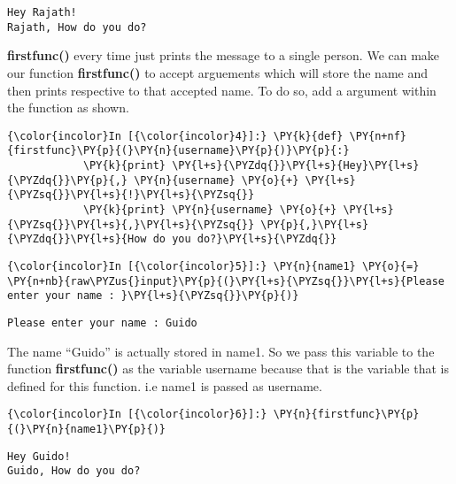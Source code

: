     \begin{Verbatim}[commandchars=\\\{\}]
Hey Rajath!
Rajath, How do you do?
    \end{Verbatim}

    \textbf{firstfunc()} every time just prints the message to a single
person. We can make our function \textbf{firstfunc()} to accept
arguements which will store the name and then prints respective to that
accepted name. To do so, add a argument within the function as shown.

    \begin{Verbatim}[commandchars=\\\{\}]
{\color{incolor}In [{\color{incolor}4}]:} \PY{k}{def} \PY{n+nf}{firstfunc}\PY{p}{(}\PY{n}{username}\PY{p}{)}\PY{p}{:}
            \PY{k}{print} \PY{l+s}{\PYZdq{}}\PY{l+s}{Hey}\PY{l+s}{\PYZdq{}}\PY{p}{,} \PY{n}{username} \PY{o}{+} \PY{l+s}{\PYZsq{}}\PY{l+s}{!}\PY{l+s}{\PYZsq{}}
            \PY{k}{print} \PY{n}{username} \PY{o}{+} \PY{l+s}{\PYZsq{}}\PY{l+s}{,}\PY{l+s}{\PYZsq{}} \PY{p}{,}\PY{l+s}{\PYZdq{}}\PY{l+s}{How do you do?}\PY{l+s}{\PYZdq{}}
\end{Verbatim}

    \begin{Verbatim}[commandchars=\\\{\}]
{\color{incolor}In [{\color{incolor}5}]:} \PY{n}{name1} \PY{o}{=} \PY{n+nb}{raw\PYZus{}input}\PY{p}{(}\PY{l+s}{\PYZsq{}}\PY{l+s}{Please enter your name : }\PY{l+s}{\PYZsq{}}\PY{p}{)}
\end{Verbatim}

    \begin{Verbatim}[commandchars=\\\{\}]
Please enter your name : Guido
    \end{Verbatim}

    The name ``Guido'' is actually stored in name1. So we pass this variable
to the function \textbf{firstfunc()} as the variable username because
that is the variable that is defined for this function. i.e name1 is
passed as username.

    \begin{Verbatim}[commandchars=\\\{\}]
{\color{incolor}In [{\color{incolor}6}]:} \PY{n}{firstfunc}\PY{p}{(}\PY{n}{name1}\PY{p}{)}
\end{Verbatim}

    \begin{Verbatim}[commandchars=\\\{\}]
Hey Guido!
Guido, How do you do?
    \end{Verbatim}

